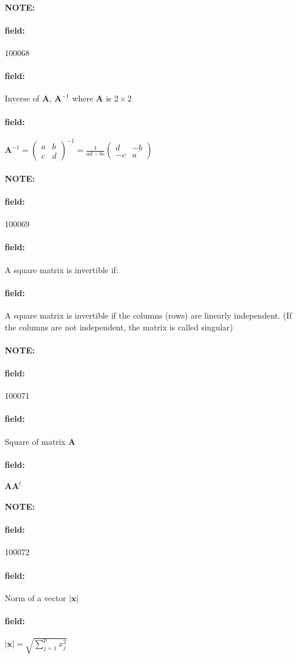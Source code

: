\documentclass[12pt]{article}
\newenvironment{note}{\paragraph{NOTE:}}{}
\newenvironment{field}{\paragraph{field:}}{}
\begin{document}
\begin{note} \begin{field} \tiny 100068 \end{field}
 \begin{field}
  Inverse of $\mathbf{A}$, $\mathbf{A}^{-1}$ where $\mathbf{A}$ is $2 \times 2$
 \end{field}
 \begin{field}
  $\mathbf{A}^{-1} = \begin{pmatrix}
    a & b \\ c & d
   \end{pmatrix}^{-1} = \frac{1}{ad - bc}\begin{pmatrix}
    d & -b \\ -c & a
   \end{pmatrix}$
 \end{field}
\end{note}

\begin{note} \begin{field} \tiny 100069 \end{field}
 \begin{field}
  A square matrix is invertible if:
 \end{field}
 \begin{field}
  A square matrix is invertible if the columns (rows) are linearly independent. (If the columns are not independent, the matrix is called singular)
 \end{field}
\end{note}

\begin{note} \begin{field} \tiny 100071 \end{field}
 \begin{field}
  Square of matrix $\mathbf{A}$
 \end{field}
 \begin{field}
  $\mathbf{AA}^t$
 \end{field}
\end{note}

\begin{note} \begin{field} \tiny 100072 \end{field}
 \begin{field}
  Norm of a vector $|\mathbf{x}|$
 \end{field}
 \begin{field}
  $|\mathbf{x}| = \sqrt{\sum_{j=1}^p x_j^2}$
 \end{field}
\end{note}
\end{document}
